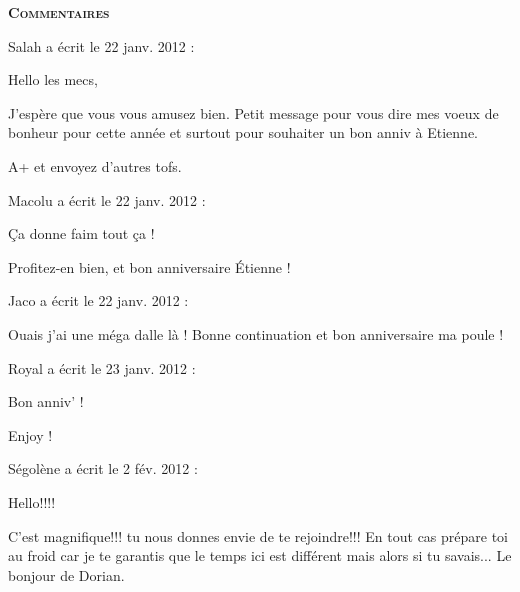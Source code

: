 \bigskip
\textbf{\textsc{Commentaires}}

\medskip
Salah  a écrit le 22 janv. 2012 :
\begin{displayquote}
Hello les mecs,

J'espère que vous vous amusez bien. Petit message pour vous dire mes voeux de bonheur pour cette année et surtout pour souhaiter un bon anniv à Etienne.

A+ et envoyez d'autres tofs.
\end{displayquote}

\medskip
Macolu a écrit le 22 janv. 2012 :
\begin{displayquote}
Ça donne faim tout ça !

Profitez-en bien, et bon anniversaire Étienne !
\end{displayquote}

\medskip
Jaco a écrit le 22 janv. 2012 :
\begin{displayquote}
Ouais j'ai une méga dalle là !
Bonne continuation et bon anniversaire ma poule !
\end{displayquote}

\medskip
Royal a écrit le 23 janv. 2012 :
\begin{displayquote}
Bon anniv' !

Enjoy !
\end{displayquote}

\medskip
Ségolène a écrit le 2 fév. 2012 :
\begin{displayquote}
Hello!!!!

C'est magnifique!!! tu nous donnes envie de te rejoindre!!!
En tout cas prépare toi au froid car je te garantis que le temps ici est différent mais alors si tu savais...
Le bonjour de Dorian.
\end{displayquote}

